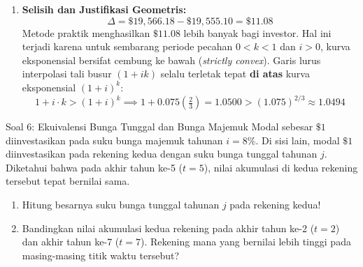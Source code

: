 \documentclass[11pt,a4paper]{article}
\begin{document}
\begin{solutionbox}[Soal 5]
\begin{enumerate}[label=(\alph*)]
    \item \textbf{Selisih dan Justifikasi Geometris:}
    \begin{equation*}
        \Delta = \$19{,}566.18 - \$19{,}555.10 = \mathbf{\$11.08}
    \end{equation*}
    Metode praktik menghasilkan $\$11.08$ lebih banyak bagi investor. Hal ini terjadi karena untuk sembarang periode pecahan $0 < k < 1$ dan $i > 0$, kurva eksponensial bersifat cembung ke bawah (\textit{strictly convex}). Garis lurus interpolasi tali busur $(1 + ik)$ selalu terletak tepat \textbf{di atas} kurva eksponensial $(1 + i)^k$:
    \begin{equation*}
        1 + i \cdot k > (1 + i)^k \implies 1 + 0.075\left(\tfrac{2}{3}\right) = 1.0500 > (1.075)^{2/3} \approx 1.0494
    \end{equation*}
\end{enumerate}
\end{solutionbox}

\vspace{1.2em}

\begin{problembox}{Soal 6: Ekuivalensi Bunga Tunggal dan Bunga Majemuk}
Modal sebesar $\$1$ diinvestasikan pada suku bunga majemuk tahunan $i = 8\%$. Di sisi lain, modal $\$1$ diinvestasikan pada rekening kedua dengan suku bunga tunggal tahunan $j$. Diketahui bahwa pada akhir tahun ke-5 ($t = 5$), nilai akumulasi di kedua rekening tersebut tepat bernilai sama.
\begin{enumerate}[label=(\alph*)]
    \item Hitung besarnya suku bunga tunggal tahunan $j$ pada rekening kedua!
    \item Bandingkan nilai akumulasi kedua rekening pada akhir tahun ke-2 ($t=2$) dan akhir tahun ke-7 ($t=7$). Rekening mana yang bernilai lebih tinggi pada masing-masing titik waktu tersebut?
\end{enumerate}
\end{problembox}
\end{document}
